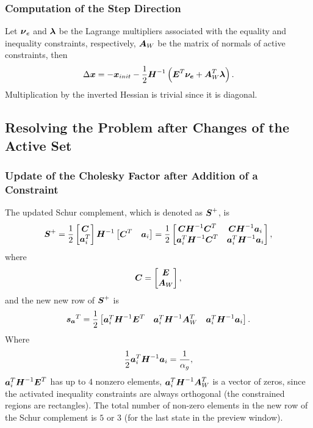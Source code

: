 \subsubsection{Computation of the Step Direction}
Let $\mbox{\boldmath $\nu$}_e$ and $\mbox{\boldmath $\lambda$}$ be the Lagrange multipliers associated with the equality
and inequality constraints, respectively, $\mbox{\boldmath $A$}_W$ be the matrix of normals of active 
constraints, then
$$
\Delta\mbox{\boldmath $x$} = -\mbox{\boldmath $x$}_{init} - \frac{1}{2} \mbox{\boldmath $H$}^{-1} \left( \mbox{\boldmath $E$}^{T}\mbox{\boldmath $\nu_e$} + \mbox{\boldmath $A$}_W^T\mbox{\boldmath $\lambda$} \right).
$$
Multiplication by the inverted Hessian is trivial since it is diagonal.



\subsection{Resolving the Problem after Changes of the Active Set}

\subsubsection{Update of the Cholesky Factor after Addition of a Constraint}\label{sec.add_ic}
The updated Schur complement, which is denoted as $\mbox{\boldmath $S$}^+$, is
$$
\mbox{\boldmath $S$}^+ = 
\frac{1}{2}
\begin{bmatrix}
    \mbox{\boldmath $C$}\\
    \mbox{\boldmath $a$}^T_i\\
\end{bmatrix}
\mbox{\boldmath $H$}^{-1}
\begin{bmatrix} \mbox{\boldmath $C$}^T & \mbox{\boldmath $a$}_i \end{bmatrix} = 
\frac{1}{2}
\begin{bmatrix}
    \mbox{\boldmath $C$} \mbox{\boldmath $H$}^{-1} \mbox{\boldmath $C$}^T      & \mbox{\boldmath $C$} \mbox{\boldmath $H$}^{-1} \mbox{\boldmath $a$}_i\\
    \mbox{\boldmath $a$}^T_i \mbox{\boldmath $H$}^{-1} \mbox{\boldmath $C$}^T    & \mbox{\boldmath $a$}^T_i \mbox{\boldmath $H$}^{-1} \mbox{\boldmath $a$}_i\\
\end{bmatrix},
$$
where
$$
\mbox{\boldmath $C$} = \begin{bmatrix} \mbox{\boldmath $E$} \\ \mbox{\boldmath $A$}_{W}\end{bmatrix},
$$
and the new new row of $\mbox{\boldmath $S$}^+$ is
$$
\mbox{\boldmath $s_a$}^T = 
\frac{1}{2}
\begin{bmatrix}
    \mbox{\boldmath $a$}^T_i \mbox{\boldmath $H$}^{-1} \mbox{\boldmath $E$}^T & \mbox{\boldmath $a$}^T_i \mbox{\boldmath $H$}^{-1} \mbox{\boldmath $A$}_W^T & \mbox{\boldmath $a$}^T_i \mbox{\boldmath $H$}^{-1} \mbox{\boldmath $a$}_i
\end{bmatrix}.
$$
Where 
$$
\frac{1}{2}\mbox{\boldmath $a$}^T_i \mbox{\boldmath $H$}^{-1} \mbox{\boldmath $a$}_i = \frac{1}{\alpha_g},
$$
$\mbox{\boldmath $a$}^T_i \mbox{\boldmath $H$}^{-1} \mbox{\boldmath $E$}^T$ has up to $4$ nonzero elements, 
$\mbox{\boldmath $a$}^T_i \mbox{\boldmath $H$}^{-1} \mbox{\boldmath $A$}_W^T$ is a vector of zeros, since the activated 
inequality constraints are always orthogonal (the constrained regions are rectangles). 
The total number of non-zero elements in the new row of the Schur complement is $5$ 
or $3$ (for the last state in the preview window).

